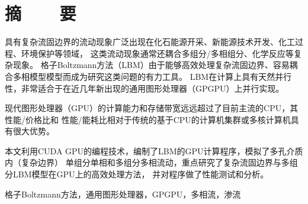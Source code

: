 ﻿%
%
%


%
%
\renewcommand{\baselinestretch}{1.5}
\fontsize{12pt}{13pt}\selectfont

\chapter{摘~~~~要}

具有复杂流固边界的流动现象广泛出现在化石能源开采、新能源技术开发、化工过程、环境保护等领域，
这类流动现象通常还耦合多组分/多相组分、化学反应等复杂现象。
格子Boltzmann方法（LBM）由于能够高效处理复杂流固边界、容易耦合多相模型模型而成为研究这类问题的有力工具。
LBM在计算上具有天然并行性，非常适合于在近几年新出现的通用图形处理器（GPGPU）上并行实现。

现代图形处理器（GPU）的计算能力和存储带宽远远超过了目前主流的CPU，其性能/价格比和
性能/能耗比相对于传统的基于CPU的计算机集群或多核计算机具有很大优势。

本文利用CUDA GPU的编程技术，编制了LBM的GPU计算程序，模拟了多孔介质内（复杂边界）
单组分单相和多组分多相流动，重点研究了复杂流固边界与多组分LBM模型在GPU上的高效处理方法，
并对程序做了性能测试和分析。

\vspace{1em}

 \quad 格子Boltzmann方法，通用图形处理器，GPGPU，多相流，渗流

